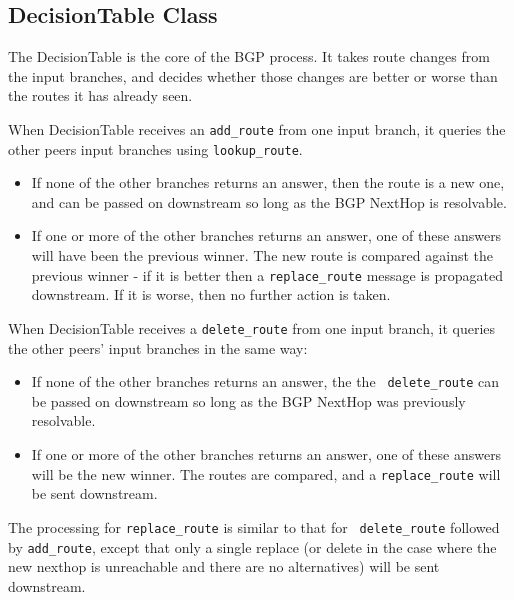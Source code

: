 \documentclass[11pt]{article}
\begin{document}
\subsection{DecisionTable Class}

The DecisionTable is the core of the BGP process.  It takes route
changes from the input branches, and decides whether those changes are
better or worse than the routes it has already seen.

When DecisionTable receives an {\tt add\_route} from one input branch,
it queries the other peers input branches using {\tt lookup\_route}.

\begin{itemize}

  \item If none of the other branches returns an answer, then the route is a
  new one, and can be passed on downstream so long as the BGP NextHop is
  resolvable.

  \item If one or more of the other branches returns an
  answer, one of these answers will have been the previous winner.  The
  new route is compared against the previous winner - if it is better
  then a {\tt replace\_route} message is propagated downstream.  If it
  is worse, then no further action is taken.

\end{itemize}

When DecisionTable receives a {\tt delete\_route} from one input
branch, it queries the other peers' input branches in the same way:

\begin{itemize}

  \item If none of the other branches returns an answer, the the {\tt
  delete\_route} can be passed on downstream so long as the BGP NextHop
  was previously resolvable.

  \item If one or more of the other branches returns an
  answer, one of these answers will be the new winner.  The routes are
  compared, and a {\tt replace\_route} will be sent downstream.

\end{itemize}

The processing for {\tt replace\_route} is similar to that for {\tt
delete\_route} followed by {\tt add\_route}, except that only a single
replace (or delete in the case where the new nexthop is unreachable
and there are no alternatives) will be sent downstream.
\end{document}
